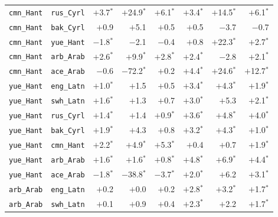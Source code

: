 \begin{longtable}{@{}ll rrr rrr@{}}
\texttt{cmn\_Hant} & \texttt{rus\_Cyrl} & $+$3.7$^{*}$ & $+$24.9$^{*}$ & $+$6.1$^{*}$ & $+$3.4$^{*}$ & $+$14.5$^{*}$ & $+$6.1$^{*}$ \\
\texttt{cmn\_Hant} & \texttt{bak\_Cyrl} & $+$0.9\phantom{$^{*}$} & $+$5.1\phantom{$^{*}$} & $+$0.5\phantom{$^{*}$} & $+$0.5\phantom{$^{*}$} & $-$3.7\phantom{$^{*}$} & $-$0.7\phantom{$^{*}$} \\
\texttt{cmn\_Hant} & \texttt{yue\_Hant} & $-$1.8$^{*}$ & $-$2.1\phantom{$^{*}$} & $-$0.4\phantom{$^{*}$} & $+$0.8\phantom{$^{*}$} & $+$22.3$^{*}$ & $+$2.7$^{*}$ \\
\texttt{cmn\_Hant} & \texttt{arb\_Arab} & $+$2.6$^{*}$ & $+$9.9$^{*}$ & $+$2.8$^{*}$ & $+$2.4$^{*}$ & $-$2.8\phantom{$^{*}$} & $+$2.1$^{*}$ \\
\texttt{cmn\_Hant} & \texttt{ace\_Arab} & $-$0.6\phantom{$^{*}$} & $-$72.2$^{*}$ & $+$0.2\phantom{$^{*}$} & $+$4.4$^{*}$ & $+$24.6$^{*}$ & $+$12.7$^{*}$ \\
\addlinespace
\texttt{yue\_Hant} & \texttt{eng\_Latn} & $+$1.0$^{*}$ & $+$1.5\phantom{$^{*}$} & $+$0.5\phantom{$^{*}$} & $+$3.4$^{*}$ & $+$4.3$^{*}$ & $+$1.9$^{*}$ \\
\texttt{yue\_Hant} & \texttt{swh\_Latn} & $+$1.6$^{*}$ & $+$1.3\phantom{$^{*}$} & $+$0.7\phantom{$^{*}$} & $+$3.0$^{*}$ & $+$5.3\phantom{$^{*}$} & $+$2.1$^{*}$ \\
\texttt{yue\_Hant} & \texttt{rus\_Cyrl} & $+$1.4$^{*}$ & $+$1.4\phantom{$^{*}$} & $+$0.9$^{*}$ & $+$3.6$^{*}$ & $+$4.8$^{*}$ & $+$4.0$^{*}$ \\
\texttt{yue\_Hant} & \texttt{bak\_Cyrl} & $+$1.9$^{*}$ & $+$4.3\phantom{$^{*}$} & $+$0.8\phantom{$^{*}$} & $+$3.2$^{*}$ & $+$4.3$^{*}$ & $+$1.0$^{*}$ \\
\texttt{yue\_Hant} & \texttt{cmn\_Hant} & $+$2.2$^{*}$ & $+$4.9$^{*}$ & $+$5.3$^{*}$ & $+$0.4\phantom{$^{*}$} & $+$0.7\phantom{$^{*}$} & $+$1.9$^{*}$ \\
\texttt{yue\_Hant} & \texttt{arb\_Arab} & $+$1.6$^{*}$ & $+$1.6$^{*}$ & $+$0.8$^{*}$ & $+$4.8$^{*}$ & $+$6.9$^{*}$ & $+$4.4$^{*}$ \\
\texttt{yue\_Hant} & \texttt{ace\_Arab} & $-$1.8$^{*}$ & $-$38.8$^{*}$ & $-$3.7$^{*}$ & $+$2.0$^{*}$ & $+$6.2\phantom{$^{*}$} & $+$3.1$^{*}$ \\
\addlinespace
\texttt{arb\_Arab} & \texttt{eng\_Latn} & $+$0.2\phantom{$^{*}$} & $+$0.0\phantom{$^{*}$} & $+$0.2\phantom{$^{*}$} & $+$2.8$^{*}$ & $+$3.2$^{*}$ & $+$1.7$^{*}$ \\
\texttt{arb\_Arab} & \texttt{swh\_Latn} & $+$0.1\phantom{$^{*}$} & $+$0.9\phantom{$^{*}$} & $+$0.4\phantom{$^{*}$} & $+$2.3$^{*}$ & $+$2.2\phantom{$^{*}$} & $+$1.7$^{*}$ \\

\end{longtable}
